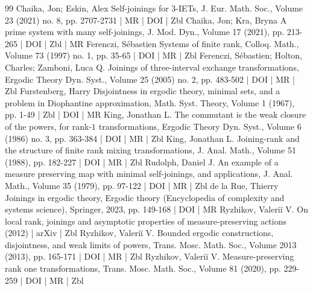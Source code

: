 \documentclass[10pt]{amsart}
\theoremstyle{definition}\newtheorem{defi}[theo]{Definition}\newtheorem{rema}[theo]{Remark}\newtheorem{exam}[theo]{Example}\newtheorem{exem}[theo]{Example}\newtheorem{nota}[theo]{Notation}
\begin{document}
\begin{thebibliography}{99}
 Chaika, Jon; Eskin, Alex Self-joinings for 3-IETs, J. Eur. Math. Soc., Volume 23 (2021) no. 8, pp. 2707-2731 | MR | DOI | Zbl
 Chaika, Jon; Kra, Bryna A prime system with many self-joinings, J. Mod. Dyn., Volume 17 (2021), pp. 213-265 | DOI | Zbl | MR
 Ferenczi, Sébastien Systems of finite rank, Colloq. Math., Volume 73 (1997) no. 1, pp. 35-65 | DOI | MR | Zbl
 Ferenczi, Sébastien; Holton, Charles; Zamboni, Luca Q. Joinings of three-interval exchange transformations, Ergodic Theory Dyn. Syst., Volume 25 (2005) no. 2, pp. 483-502 | DOI | MR | Zbl
 Furstenberg, Harry Disjointness in ergodic theory, minimal sets, and a problem in Diophantine approximation, Math. Syst. Theory, Volume 1 (1967), pp. 1-49 | Zbl | DOI | MR
 King, Jonathan L. The commutant is the weak closure of the powers, for rank-$1$ transformations, Ergodic Theory Dyn. Syst., Volume 6 (1986) no. 3, pp. 363-384 | DOI | MR | Zbl
 King, Jonathan L. Joining-rank and the structure of finite rank mixing transformations, J. Anal. Math., Volume 51 (1988), pp. 182-227 | DOI | MR | Zbl
 Rudolph, Daniel J. An example of a measure preserving map with minimal self-joinings, and applications, J. Anal. Math., Volume 35 (1979), pp. 97-122 | DOI | MR | Zbl
 de la Rue, Thierry Joinings in ergodic theory, Ergodic theory (Encyclopedia of complexity and systems science), Springer, 2023, pp. 149-168 | DOI | MR
 Ryzhikov, Valeriĭ V. On local rank, joinings and asymptotic properties of measure-preserving actions (2012) | arXiv | Zbl
 Ryzhikov, Valeriĭ V. Bounded ergodic constructions, disjointness, and weak limits of powers, Trans. Mosc. Math. Soc., Volume 2013 (2013), pp. 165-171 | DOI | MR | Zbl
 Ryzhikov, Valeriĭ V. Measure-preserving rank one transformations, Trans. Mosc. Math. Soc., Volume 81 (2020), pp. 229-259 | DOI | MR | Zbl
\end{thebibliography}
\end{document}
